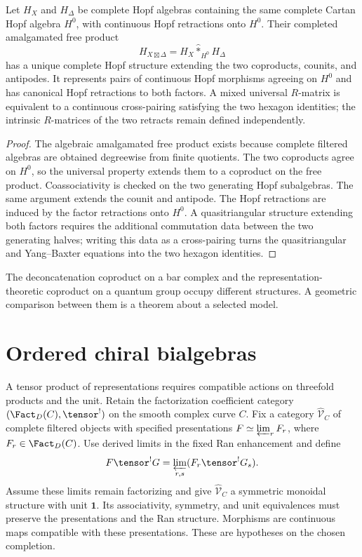 \begin{theorem}
Let $H_X$ and $H_\Delta$ be complete Hopf algebras containing the same complete Cartan Hopf algebra $H^0$, with continuous Hopf retractions onto $H^0$.  Their completed amalgamated free product
\[
 H_{X\boxtimes\Delta}
 =H_X\widehat *_{H^0}H_\Delta
\]
has a unique complete Hopf structure extending the two coproducts, counits, and antipodes.  It represents pairs of continuous Hopf morphisms agreeing on $H^0$ and has canonical Hopf retractions to both factors.  A mixed universal $R$-matrix is equivalent to a continuous cross-pairing satisfying the two hexagon identities; the intrinsic $R$-matrices of the two retracts remain defined independently.
\end{theorem}
\begin{proof}
The algebraic amalgamated free product exists because complete filtered algebras are obtained degreewise from finite quotients.  The two coproducts agree on $H^0$, so the universal property extends them to a coproduct on the free product.  Coassociativity is checked on the two generating Hopf subalgebras.  The same argument extends the counit and antipode.  The Hopf retractions are induced by the factor retractions onto $H^0$.  A quasitriangular structure extending both factors requires the additional commutation data between the two generating halves; writing this data as a cross-pairing turns the quasitriangular and Yang--Baxter equations into the two hexagon identities.
\end{proof}

The deconcatenation coproduct on a bar complex and the representation-theoretic coproduct on a quantum group occupy different structures. A geometric comparison between them is a theorem about a selected model.

\chapter{Ordered chiral bialgebras}
A tensor product of representations requires compatible actions on
threefold products and the unit.
Retain the factorization coefficient category
$(\Fact_D(C),\tensor^!)$ on the smooth complex curve $C$.
Fix a category $\widehat{\mathcal V}_C$ of complete filtered objects
with specified presentations $F\simeq\varprojlim_r F_r$,
where $F_r\in\Fact_D(C)$.
Use derived limits in the fixed Ran enhancement and define
\[
 F\widehat{\tensor}^{!}G
 =\varprojlim_{r,s}(F_r\tensor^!G_s).
\]
Assume these limits remain factorizing and give
$\widehat{\mathcal V}_C$ a symmetric monoidal structure with unit $\mathbf1$.
Its associativity, symmetry, and unit equivalences must preserve
the presentations and the Ran structure.
Morphisms are continuous maps compatible with these presentations.
These are hypotheses on the chosen completion.

